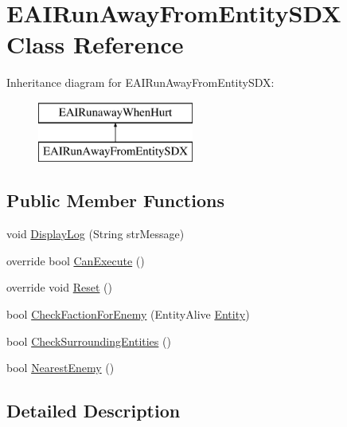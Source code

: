 \hypertarget{class_e_a_i_run_away_from_entity_s_d_x}{}\section{E\+A\+I\+Run\+Away\+From\+Entity\+S\+DX Class Reference}
\label{class_e_a_i_run_away_from_entity_s_d_x}
Inheritance diagram for E\+A\+I\+Run\+Away\+From\+Entity\+S\+DX\+:\begin{figure}[H]
\begin{center}
\leavevmode
\includegraphics[height=2.000000cm]{d7/d71/class_e_a_i_run_away_from_entity_s_d_x}
\end{center}
\end{figure}
\subsection*{Public Member Functions}
\begin{DoxyCompactItemize}
\item 
void \mbox{\hyperlink{class_e_a_i_run_away_from_entity_s_d_x_a9e3ef2d95c8b095197fa92a9bb3b7bc5}{Display\+Log}} (String str\+Message)
\item 
override bool \mbox{\hyperlink{class_e_a_i_run_away_from_entity_s_d_x_ace930c70cc6973736efd632ad966b92f}{Can\+Execute}} ()
\item 
override void \mbox{\hyperlink{class_e_a_i_run_away_from_entity_s_d_x_a0aed936e205eb5f5634ece8528f61f95}{Reset}} ()
\item 
bool \mbox{\hyperlink{class_e_a_i_run_away_from_entity_s_d_x_a86965636a2bda1137c97d41e9e37de0e}{Check\+Faction\+For\+Enemy}} (Entity\+Alive \mbox{\hyperlink{_the_01_restless_01_curse_2_config_2_localization_8txt_a831452d5736d8c492ddd792b09c12cde}{Entity}})
\item 
bool \mbox{\hyperlink{class_e_a_i_run_away_from_entity_s_d_x_a1fe2c1086cb2d9322073487899de210d}{Check\+Surrounding\+Entities}} ()
\item 
bool \mbox{\hyperlink{class_e_a_i_run_away_from_entity_s_d_x_afc6aef51395f4c9f826a00b89e330165}{Nearest\+Enemy}} ()
\end{DoxyCompactItemize}


\subsection{Detailed Description}


